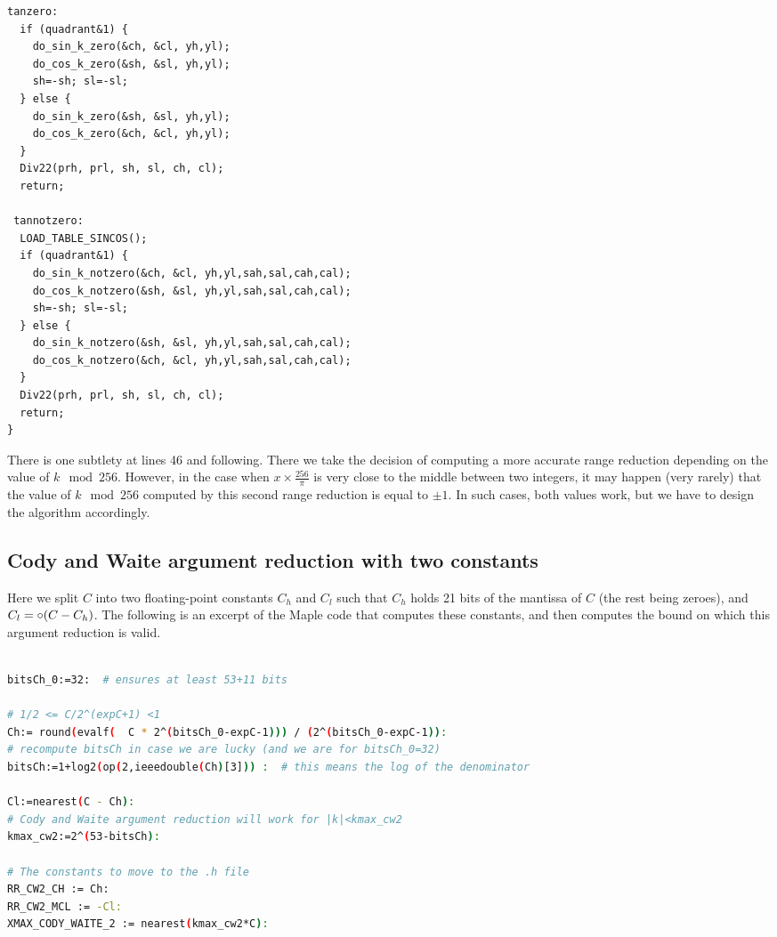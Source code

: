 \begin{lstlisting}[caption={Multilevel argument reduction},firstnumber=1]
 tanzero:
  if (quadrant&1) {
    do_sin_k_zero(&ch, &cl, yh,yl);
    do_cos_k_zero(&sh, &sl, yh,yl);
    sh=-sh; sl=-sl;
  } else {
    do_sin_k_zero(&sh, &sl, yh,yl);
    do_cos_k_zero(&ch, &cl, yh,yl);
  }
  Div22(prh, prl, sh, sl, ch, cl);
  return;

 tannotzero:
  LOAD_TABLE_SINCOS();
  if (quadrant&1) {
    do_sin_k_notzero(&ch, &cl, yh,yl,sah,sal,cah,cal);
    do_cos_k_notzero(&sh, &sl, yh,yl,sah,sal,cah,cal);
    sh=-sh; sl=-sl;
  } else {
    do_sin_k_notzero(&sh, &sl, yh,yl,sah,sal,cah,cal);
    do_cos_k_notzero(&ch, &cl, yh,yl,sah,sal,cah,cal);
  }
  Div22(prh, prl, sh, sl, ch, cl);
  return;
}

\end{lstlisting}
 

There is one subtlety at lines 46 and following. There we take the
decision of computing a more accurate range reduction depending on the
value of $k\mod 256$. However, in the case when
$x\times\frac{256}{\pi}$ is very close to the middle between two
integers, it may happen (very rarely) that the value of $k\mod 256$
computed by this second range reduction is equal to $\pm 1$. In such
cases, both values work, but we have to design the algorithm
accordingly.

\subsection{Cody and Waite argument reduction with two constants}

Here we split $C$ into two floating-point constants $C_h$ and $C_l$
such that $C_h$ holds 21 bits of the mantissa of $C$ (the rest being
zeroes), and $C_l=\circ(C-C_h)$.  The following is an excerpt of the
Maple code that computes these constants, and then computes the
bound on which this argument reduction is valid.

\begin{lstlisting}[caption={Computing constants for Cody and Waite 2},
  firstnumber=1,  language={sh}]% of course it's maple
%Skip a line here, I don't know why, otherwise latex eats the first line

bitsCh_0:=32:  # ensures at least 53+11 bits

# 1/2 <= C/2^(expC+1) <1
Ch:= round(evalf(  C * 2^(bitsCh_0-expC-1))) / (2^(bitsCh_0-expC-1)):
# recompute bitsCh in case we are lucky (and we are for bitsCh_0=32)
bitsCh:=1+log2(op(2,ieeedouble(Ch)[3])) :  # this means the log of the denominator

Cl:=nearest(C - Ch):
# Cody and Waite argument reduction will work for |k|<kmax_cw2
kmax_cw2:=2^(53-bitsCh):

# The constants to move to the .h file
RR_CW2_CH := Ch:
RR_CW2_MCL := -Cl:
XMAX_CODY_WAITE_2 := nearest(kmax_cw2*C):
\end{lstlisting}

